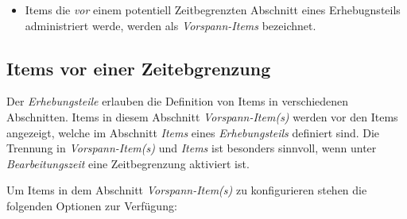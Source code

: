 \documentclass[
  letterpaper,
  DIV=11]{scrreprt}
\providecommand{\tightlist}{%
  \setlength{\itemsep}{0pt}\setlength{\parskip}{0pt}}\usepackage{longtable,booktabs,array}
\begin{document}
\begin{itemize}
\tightlist
\item
  Items die \emph{vor} einem potentiell Zeitbegrenzten Abschnitt eines
  Erhebugnsteils administriert werde, werden als \emph{Vorspann-Items}
  bezeichnet.
\end{itemize}

\begin{tcolorbox}[enhanced jigsaw, colbacktitle=quarto-callout-tip-color!10!white, coltitle=black, colframe=quarto-callout-tip-color-frame, leftrule=.75mm, breakable, opacitybacktitle=0.6, toprule=.15mm, title=\textcolor{quarto-callout-tip-color}{\faLightbulb}\hspace{0.5em}{Eingebettete Programmhilfe}, colback=white, titlerule=0mm, arc=.35mm, bottomtitle=1mm, toptitle=1mm, rightrule=.15mm, bottomrule=.15mm, left=2mm, opacityback=0]

\hypertarget{items-vor-einer-zeitebgrenzung-1}{%
\subsection{Items vor einer
Zeitebgrenzung}\label{items-vor-einer-zeitebgrenzung-1}}

Der \emph{Erhebungsteile} erlauben die Definition von Items in
verschiedenen Abschnitten. Items in diesem Abschnitt
\emph{Vorspann-Item(s)} werden vor den Items angezeigt, welche im
Abschnitt \emph{Items} eines \emph{Erhebungsteils} definiert sind. Die
Trennung in \emph{Vorspann-Item(s)} und \emph{Items} ist besonders
sinnvoll, wenn unter \emph{Bearbeitungszeit} eine Zeitbegrenzung
aktiviert ist.

Um Items in dem Abschnitt \emph{Vorspann-Item(s)} zu konfigurieren
stehen die folgenden Optionen zur Verfügung:


\end{tcolorbox}
\end{document}
